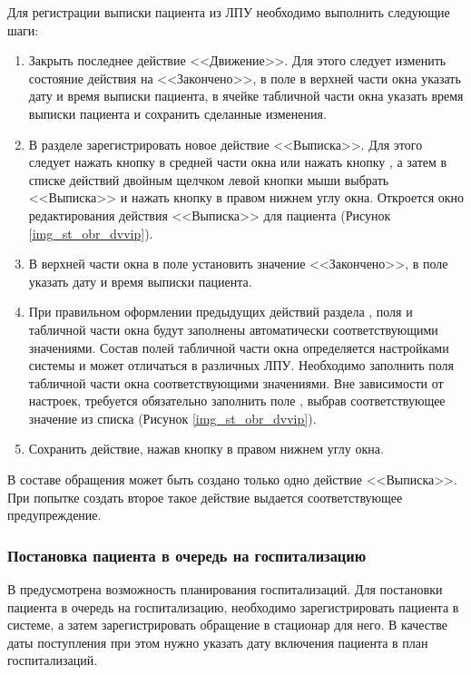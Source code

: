 Для регистрации выписки пациента из ЛПУ необходимо выполнить следующие шаги:
\begin{enumerate}
 \item Закрыть последнее действие <<Движение>>. Для этого следует изменить состояние действия на <<Закончено>>, в поле  в верхней части окна указать дату и время выписки пациента, в ячейке  табличной части окна указать время выписки пациента и сохранить сделанные изменения.
 \item В разделе  зарегистрировать новое действие <<Выписка>>. Для этого следует нажать кнопку  в средней части окна или нажать кнопку  , а затем в списке действий двойным щелчком левой кнопки мыши выбрать <<Выписка>> и нажать кнопку   в правом нижнем углу окна. Откроется окно редактирования действия <<Выписка>> для пациента (Рисунок \ref{img_st_obr_dvvip}).
 \item В верхней части окна в поле  установить значение <<Закончено>>, в поле  указать дату и время выписки пациента.
 \item При правильном оформлении предыдущих действий раздела , поля  и  табличной части окна будут заполнены автоматически соответствующими значениями. Состав полей табличной части окна определяется настройками системы и может отличаться в различных ЛПУ. Необходимо заполнить  поля табличной части окна соответствующими значениями. Вне зависимости от настроек, требуется обязательно заполнить поле , выбрав соответствующее значение из списка (Рисунок \ref{img_st_obr_dvvip}).
 \item Сохранить действие, нажав кнопку  в правом нижнем углу окна.
\end{enumerate}

\begin{vnim}
 В составе обращения может быть создано только одно действие <<Выписка>>. При попытке создать второе такое действие выдается соответствующее предупреждение.
\end{vnim}

\subsubsection{Постановка пациента в очередь на госпитализацию}

В \tmis предусмотрена возможность планирования госпитализаций. Для постановки пациента в очередь на госпитализацию, необходимо зарегистрировать пациента в системе, а затем зарегистрировать обращение в стационар для него. В качестве даты поступления при этом нужно указать дату включения пациента в план госпитализаций.

